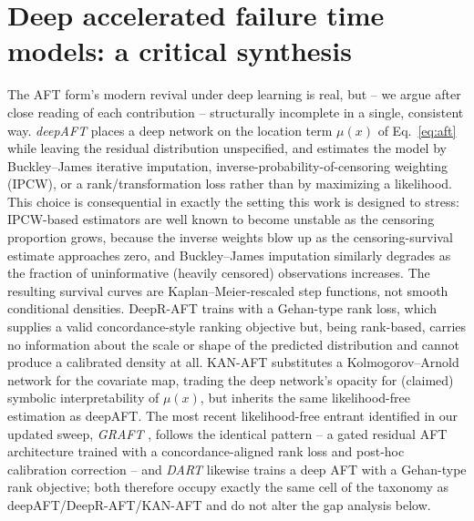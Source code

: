 \documentclass[11pt]{article}
\begin{document}
\section{Deep accelerated failure time models: a critical synthesis}
\label{sec:deepaft}

The AFT form's modern revival under deep learning is real, but -- we argue
after close reading of each contribution -- structurally incomplete in a
single, consistent way. \emph{deepAFT} \citep{norman2024deepaft} places a
deep network on the location term $\mu(x)$ of Eq.~\eqref{eq:aft} while
leaving the residual distribution unspecified, and estimates the model by
Buckley--James iterative imputation, inverse-probability-of-censoring
weighting (IPCW), or a rank/transformation loss rather than by maximizing
a likelihood. This choice is consequential in exactly the setting this
work is designed to stress: IPCW-based estimators are well known to
become unstable as the censoring proportion grows, because the inverse
weights blow up as the censoring-survival estimate approaches zero, and
Buckley--James imputation similarly degrades as the fraction of
uninformative (heavily censored) observations increases. The resulting
survival curves are Kaplan--Meier-rescaled step functions, not smooth
conditional densities. DeepR-AFT \citep{kim2022deepraft} trains with a
Gehan-type rank loss, which supplies a valid concordance-style ranking
objective but, being rank-based, carries no information about the scale
or shape of the predicted distribution and cannot produce a calibrated
density at all. KAN-AFT \citep{francis2025kanaft} substitutes a
Kolmogorov--Arnold network for the covariate map, trading the deep
network's opacity for (claimed) symbolic interpretability of $\mu(x)$,
but inherits the same likelihood-free estimation as deepAFT. The most
recent likelihood-free entrant identified in our updated sweep,
\emph{GRAFT} \citep{graft2026}, follows the identical pattern -- a
gated residual AFT architecture trained with a concordance-aligned rank
loss and post-hoc calibration correction -- and \emph{DART}
\citep{dart2023} likewise trains a deep AFT with a Gehan-type rank
objective; both therefore occupy exactly the same cell of the taxonomy as
deepAFT/DeepR-AFT/KAN-AFT and do not alter the gap analysis below.
\end{document}
